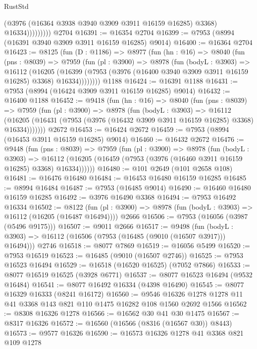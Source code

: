 \begin{lexlean}{RustStd}
\begin{coremodule}
                      (@3976 (@16364 @3938 @3940 @3909 @3911 @16159 @16285) @3368)
                      @16334)))))))))
    @2704
@16391 := @16354 @2704
@16399 := @7953 (@8994 (@16391 @3940 @3909 @3911 @16159 @16285) @9014)
@16400 := @16364 @2704
@16423 := @8125
    (fun (D : @1186) =>
    @8977
      (fun (hn : @16) =>
      @8040
        (fun (pns : @8039) =>
        @7959
          (fun (pl : @3900) =>
          @8978
            (fun (bodyL : @3903) =>
            @16112
              (@16205
                (@16399 (@7953 (@3976 (@16400 @3940 @3909 @3911 @16159 @16285) @3368) @16334))))))))
    @1188
@16424 := @16391 @1188
@16431 := @7953 (@8994 (@16424 @3909 @3911 @16159 @16285) @9014)
@16432 := @16400 @1188
@16452 := @9418
    (fun (hn : @16) =>
    @8040
      (fun (pns : @8039) =>
      @7959
        (fun (pl : @3900) =>
        @8978
          (fun (bodyL : @3903) =>
          @16112
            (@16205 (@16431 (@7953 (@3976 (@16432 @3909 @3911 @16159 @16285) @3368) @16334)))))))
    @2672
@16453 := @16424 @2672
@16459 := @7953 (@8994 (@16453 @3911 @16159 @16285) @9014)
@16460 := @16432 @2672
@16476 := @9448
    (fun (pns : @8039) =>
    @7959
      (fun (pl : @3900) =>
      @8978
        (fun (bodyL : @3903) =>
        @16112 (@16205 (@16459 (@7953 (@3976 (@16460 @3911 @16159 @16285) @3368) @16334))))))
@16480 := @101 @2649 (@101 @2658 @108)
@16481 := @16476 @16480
@16484 := @16453 @16480 @16159 @16285
@16485 := @8994 @16484
@16487 := @7953 (@16485 @9014)
@16490 := @16460 @16480 @16159 @16285
@16492 := @3976 @16490 @3368
@16494 := @7953 @16492 @16334
@16502 := @8122
    (fun (pl : @3900) => @8978 (fun (bodyL : @3903) => @16112 (@16205 (@16487 @16494))))
    @2666
@16506 := @7953 (@16056 (@3987 (@5496 @9175)))
@16507 := @9011 @2666
@16517 := @9498
    (fun (bodyL : @3903) => @16112 (@16506 (@7953 (@16485 (@9010 (@16507 @3917))) @16494)))
    @2746
@16518 := @8077 @7869
@16519 := @16056 @5499
@16520 := @7953 @16519
@16523 := @16485 (@9010 (@16507 @2746))
@16525 := @7953 @16523 @16494
@16529 := @16518 (@16520 @16525) (@7052 @7866)
@16533 := @8077 @16519 @16525 (@3928 @6771)
@16537 := @8077 @16523 @16494 (@9532 @16484)
@16541 := @8077 @16492 @16334 (@4398 @16490)
@16545 := @8077 @16329 @16333 (@8241 @16172)
@16560 := @9546 @16326 @1278 @1278 @11 @41 @3368 @143 @821 @110 @1475 @16282 @108 @1560 @2692 @1566
@16562 := @8308 @16326 @1278
@16566 := @16562 @30 @41 @30 @1475
@16567 := @8317 @16326
@16572 := @16560 (@16566 (@8316 (@16567 @30)) @8443)
@16573 := @9577 @16326
@16590 := @16573
    @16326
    @1278
    @41
    @3368
    @821
    @109
    @1278

\end{coremodule}
\end{lexlean}
